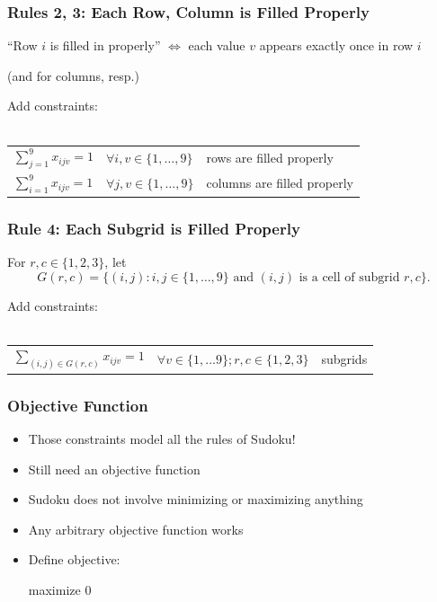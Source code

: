 \documentclass[10pt,aspectratio=169]{beamer}
\newcommand{\stanza}{ \\~\ }
\begin{document}
\begin{frame} \frametitle{Rules 2, 3: Each Row, Column is Filled Properly}

\begin{center}
  ``Row $i$ is filled in properly'' $\Leftrightarrow$ each value $v$ appears exactly once in row $i$

  (and for columns, resp.)
\end{center}

Add constraints:
\stanza

  \begin{tabular}{lll}
    $\sum_{j=1}^9 x_{ijv} = 1$ & $\forall i, v \in \{1, \ldots, 9\}$ & rows are filled properly \\
    $\sum_{i=1}^9 x_{ijv} = 1$ & $\forall j, v \in \{1, \ldots, 9\}$ & columns are filled properly
  \end{tabular}
\end{frame}

\begin{frame} \frametitle{Rule 4: Each Subgrid is Filled Properly}

  For $r, c \in \{1, 2, 3\}$, let
  \[ G(r, c) = \{
  (i, j) : i, j \in \{1, \ldots, 9\}
  \text{ and } (i, j)
  \text{ is a cell of subgrid } r, c
  \} . \]

  Add constraints:
  \stanza
  \begin{tabular}{lll}
    $\sum_{(i, j) \in G(r, c)} x_{ijv} = 1$ & $\forall v \in \{1, \ldots 9\}; r,c \in \{1, 2, 3\}$ & subgrids
  \end{tabular}
  
\end{frame}

\begin{frame} \frametitle{Objective Function}
  \begin{itemize}
    \item Those constraints model all the rules of Sudoku!
    \item Still need an objective function
    \item Sudoku does not involve minimizing or maximizing anything
    \item Any arbitrary objective function works
    \item Define objective:

      maximize 0

  \end{itemize}
\end{frame}
\end{document}
